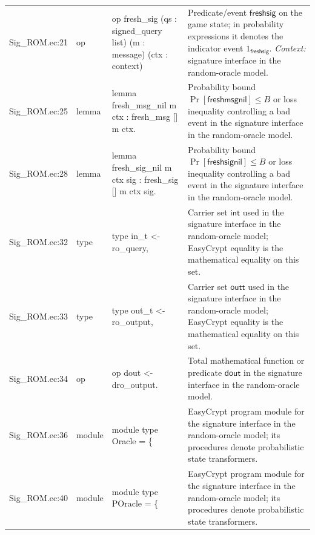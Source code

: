 \documentclass[10pt]{article}
\begin{document}
\begin{longtable}{L{0.11\textwidth}L{0.055\textwidth}L{0.385\textwidth}L{0.41\textwidth}}
Sig\_\allowbreak{}ROM.\allowbreak{}ec:\allowbreak{}21 & op & {\ttfamily\scriptsize op fresh\_\allowbreak{}sig (qs : signed\_\allowbreak{}query list) (m : message) (ctx : context)} & Predicate/event $\mathsf{freshsig}$ on the game state; in probability expressions it denotes the indicator event $1_{\mathsf{freshsig}}$. \emph{Context:} signature interface in the random-oracle model. \\
Sig\_\allowbreak{}ROM.\allowbreak{}ec:\allowbreak{}25 & lemma & {\ttfamily\scriptsize lemma fresh\_\allowbreak{}msg\_\allowbreak{}nil m ctx : fresh\_\allowbreak{}msg [] m ctx.} & Probability bound $\Pr[\mathsf{freshmsgnil}]\le B$ or loss inequality controlling a bad event in the signature interface in the random-oracle model. \\
Sig\_\allowbreak{}ROM.\allowbreak{}ec:\allowbreak{}28 & lemma & {\ttfamily\scriptsize lemma fresh\_\allowbreak{}sig\_\allowbreak{}nil m ctx sig : fresh\_\allowbreak{}sig [] m ctx sig.} & Probability bound $\Pr[\mathsf{freshsignil}]\le B$ or loss inequality controlling a bad event in the signature interface in the random-oracle model. \\
Sig\_\allowbreak{}ROM.\allowbreak{}ec:\allowbreak{}32 & type & {\ttfamily\scriptsize type in\_\allowbreak{}t \textless{}- ro\_\allowbreak{}query,} & Carrier set $\mathsf{int}$ used in the signature interface in the random-oracle model; EasyCrypt equality is the mathematical equality on this set. \\
Sig\_\allowbreak{}ROM.\allowbreak{}ec:\allowbreak{}33 & type & {\ttfamily\scriptsize type out\_\allowbreak{}t \textless{}- ro\_\allowbreak{}output,} & Carrier set $\mathsf{outt}$ used in the signature interface in the random-oracle model; EasyCrypt equality is the mathematical equality on this set. \\
Sig\_\allowbreak{}ROM.\allowbreak{}ec:\allowbreak{}34 & op & {\ttfamily\scriptsize op dout \textless{}- dro\_\allowbreak{}output.} & Total mathematical function or predicate $\mathsf{dout}$ in the signature interface in the random-oracle model. \\
Sig\_\allowbreak{}ROM.\allowbreak{}ec:\allowbreak{}36 & module & {\ttfamily\scriptsize module type Oracle = \{} & EasyCrypt program module for the signature interface in the random-oracle model; its procedures denote probabilistic state transformers. \\
Sig\_\allowbreak{}ROM.\allowbreak{}ec:\allowbreak{}40 & module & {\ttfamily\scriptsize module type POracle = \{} & EasyCrypt program module for the signature interface in the random-oracle model; its procedures denote probabilistic state transformers. \\

\end{longtable}
\end{document}
